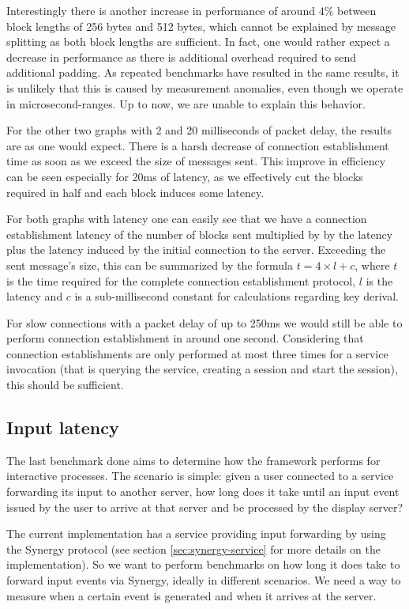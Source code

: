 Interestingly there is another increase in performance of around $4\%$ between block lengths of 256 bytes and 512 bytes, which cannot be explained by message splitting as both block lengths are sufficient.
In fact, one would rather expect a decrease in performance as there is additional overhead required to send additional padding.
As repeated benchmarks have resulted in the same results, it is unlikely that this is caused by measurement anomalies, even though we operate in microsecond-ranges.
Up to now, we are unable to explain this behavior.

For the other two graphs with 2 and 20 milliseconds of packet delay, the results are as one would expect.
There is a harsh decrease of connection establishment time as soon as we exceed the size of messages sent.
This improve in efficiency can be seen especially for 20ms of latency, as we effectively cut the blocks required in half and each block induces some latency.

For both graphs with latency one can easily see that we have a connection establishment latency of the number of blocks sent multiplied by by the latency plus the latency induced by the initial connection to the server.
Exceeding the sent message's size, this can be summarized by the formula $t = 4 \times l + c$, where $t$ is the time required for the complete connection establishment protocol, $l$ is the latency and $c$ is a sub-millisecond constant for calculations regarding key derival.

For slow connections with a packet delay of up to 250ms we would still be able to perform connection establishment in around one second.
Considering that connection establishments are only performed at most three times for a service invocation (that is querying the service, creating a session and start the session), this should be sufficient.

\subsection{Input latency}

The last benchmark done aims to determine how the framework performs for interactive processes.
The scenario is simple: given a user connected to a service forwarding its input to another server, how long does it take until an input event issued by the user to arrive at that server and be processed by the display server?

The current implementation has a service providing input forwarding by using the Synergy protocol (see section \ref{sec:synergy-service} for more details on the implementation).
So we want to perform benchmarks on how long it does take to forward input events via Synergy, ideally in different scenarios.
We need a way to measure when a certain event is generated and when it arrives at the server.

